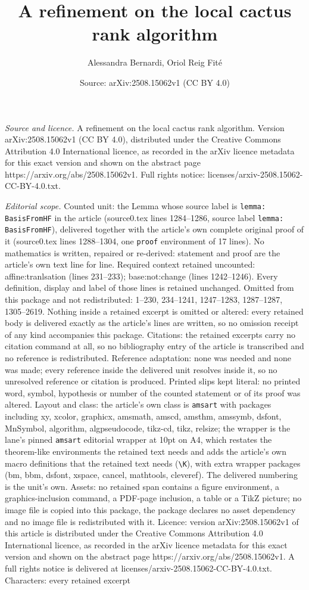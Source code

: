 \documentclass[10pt,a4paper]{amsart}
\title[A refinement on the local cactus rank algorithm]{A refinement on the local cactus rank algorithm}
\author{Alessandra Bernardi, Oriol Reig Fit\'e}
\date{Source: arXiv:2508.15062v1 (CC BY 4.0)}
\begin{document}
\maketitle

\noindent\emph{Source and licence.} A refinement on the local cactus rank algorithm. Version arXiv:2508.15062v1 (CC BY 4.0), distributed under the Creative Commons Attribution 4.0 International licence, as recorded in the arXiv licence metadata for this exact version and shown on the abstract page https://arxiv.org/abs/2508.15062v1. Full rights notice: licenses/arxiv-2508.15062-CC-BY-4.0.txt.\par\smallskip

\noindent\textit{Editorial scope.} Counted unit: the Lemma whose source label is \texttt{lemma: BasisFromHF} in the article (source0.tex lines 1284--1286, source label \texttt{lemma: BasisFromHF}), delivered together with the article's own complete original proof of it (source0.tex lines 1288--1304, one \texttt{proof} environment of 17 lines). No mathematics is written, repaired or re-derived: statement and proof are the article's own text line for line. Required context retained uncounted: affine:tranlsation (lines 231--233); base:not:change (lines 1242--1246). Every definition, display and label of those lines is retained unchanged. Omitted from this package and not redistributed: 1--230, 234--1241, 1247--1283, 1287--1287, 1305--2619. Nothing inside a retained excerpt is omitted or altered: every retained body is delivered exactly as the article's lines are written, so no omission receipt of any kind accompanies this package. Citations: the retained excerpts carry no citation command at all, so no bibliography entry of the article is transcribed and no reference is redistributed. Reference adaptation: none was needed and none was made; every reference inside the delivered unit resolves inside it, so no unresolved reference or citation is produced. Printed slips kept literal: no printed word, symbol, hypothesis or number of the counted statement or of its proof was altered. Layout and class: the article's own class is \texttt{amsart} with packages including xy, xcolor, graphicx, amsmath, amscd, amsthm, amssymb, dsfont, MnSymbol, algorithm, algpseudocode, tikz-cd, tikz, relsize; the wrapper is the lane's pinned \texttt{amsart} editorial wrapper at 10pt on A4, which restates the theorem-like environments the retained text needs and adds the article's own macro definitions that the retained text needs (\texttt{\textbackslash K}), with extra wrapper packages (bm, bbm, dsfont, xspace, cancel, mathtools, cleveref). The delivered numbering is the unit's own. Assets: no retained span contains a figure environment, a graphics-inclusion command, a PDF-page inclusion, a table or a TikZ picture; no image file is copied into this package, the package declares no asset dependency and no image file is redistributed with it. Licence: version arXiv:2508.15062v1 of this article is distributed under the Creative Commons Attribution 4.0 International licence, as recorded in the arXiv licence metadata for this exact version and shown on the abstract page https://arxiv.org/abs/2508.15062v1. A full rights notice is delivered at licenses/arxiv-2508.15062-CC-BY-4.0.txt. Characters: every retained excerpt 
\end{document}
